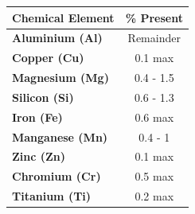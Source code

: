 \documentclass{article}
\begin{document}
\begin{minipage}{0.44\textwidth}
        
    \vspace{1em}
    \begin{tabular}{|>{\normalsize\bfseries}l|>{\normalsize}c|}
        \hline
        \large\textbf{Chemical Element} & \large\textbf{\% Present} \\ \hline
        Aluminium (Al)            & Remainder         \\ \hline
        Copper (Cu)               & 0.1 max           \\ \hline
        Magnesium (Mg)            & 0.4 - 1.5         \\ \hline
        Silicon (Si)              & 0.6 - 1.3         \\ \hline
        Iron (Fe)                 & 0.6 max           \\ \hline
        Manganese (Mn)            & 0.4 - 1         \\ \hline
        Zinc (Zn)                 & 0.1 max           \\ \hline
        Chromium (Cr)             & 0.5 max           \\ \hline
        Titanium (Ti)             & 0.2 max           \\ \hline
    \end{tabular}
    \label{tab:composition_he30}
\end{minipage}
\hfill
\end{document}
